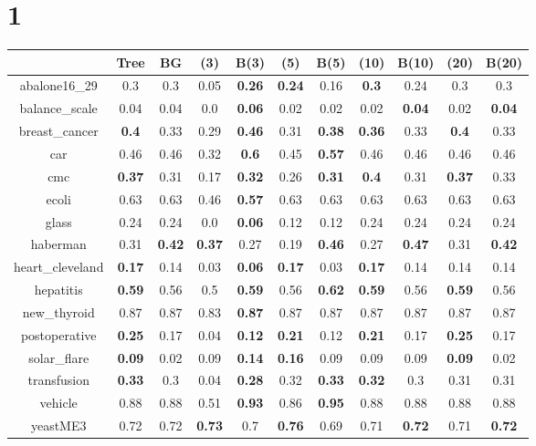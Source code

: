 \documentclass{article}%
\begin{document}
\section*{1}%
\begin{tabular}{c|cccccccccc}%
\hline%
&Tree&BG&(3)&B(3)&(5)&B(5)&(10)&B(10)&(20)&B(20)\\%
\hline%
abalone16\_29&0.3&0.3&0.05&\textbf{0.26}&\textbf{0.24}&0.16&\textbf{0.3}&0.24&0.3&0.3\\%
\hline%
balance\_scale&0.04&0.04&0.0&\textbf{0.06}&0.02&0.02&0.02&\textbf{0.04}&0.02&\textbf{0.04}\\%
\hline%
breast\_cancer&\textbf{0.4}&0.33&0.29&\textbf{0.46}&0.31&\textbf{0.38}&\textbf{0.36}&0.33&\textbf{0.4}&0.33\\%
\hline%
car&0.46&0.46&0.32&\textbf{0.6}&0.45&\textbf{0.57}&0.46&0.46&0.46&0.46\\%
\hline%
cmc&\textbf{0.37}&0.31&0.17&\textbf{0.32}&0.26&\textbf{0.31}&\textbf{0.4}&0.31&\textbf{0.37}&0.33\\%
\hline%
ecoli&0.63&0.63&0.46&\textbf{0.57}&0.63&0.63&0.63&0.63&0.63&0.63\\%
\hline%
glass&0.24&0.24&0.0&\textbf{0.06}&0.12&0.12&0.24&0.24&0.24&0.24\\%
\hline%
haberman&0.31&\textbf{0.42}&\textbf{0.37}&0.27&0.19&\textbf{0.46}&0.27&\textbf{0.47}&0.31&\textbf{0.42}\\%
\hline%
heart\_cleveland&\textbf{0.17}&0.14&0.03&\textbf{0.06}&\textbf{0.17}&0.03&\textbf{0.17}&0.14&0.14&0.14\\%
\hline%
hepatitis&\textbf{0.59}&0.56&0.5&\textbf{0.59}&0.56&\textbf{0.62}&\textbf{0.59}&0.56&\textbf{0.59}&0.56\\%
\hline%
new\_thyroid&0.87&0.87&0.83&\textbf{0.87}&0.87&0.87&0.87&0.87&0.87&0.87\\%
\hline%
postoperative&\textbf{0.25}&0.17&0.04&\textbf{0.12}&\textbf{0.21}&0.12&\textbf{0.21}&0.17&\textbf{0.25}&0.17\\%
\hline%
solar\_flare&\textbf{0.09}&0.02&0.09&\textbf{0.14}&\textbf{0.16}&0.09&0.09&0.09&\textbf{0.09}&0.02\\%
\hline%
transfusion&\textbf{0.33}&0.3&0.04&\textbf{0.28}&0.32&\textbf{0.33}&\textbf{0.32}&0.3&0.31&0.31\\%
\hline%
vehicle&0.88&0.88&0.51&\textbf{0.93}&0.86&\textbf{0.95}&0.88&0.88&0.88&0.88\\%
\hline%
yeastME3&0.72&0.72&\textbf{0.73}&0.7&\textbf{0.76}&0.69&0.71&\textbf{0.72}&0.71&\textbf{0.72}\\%

\end{tabular}
\end{document}
